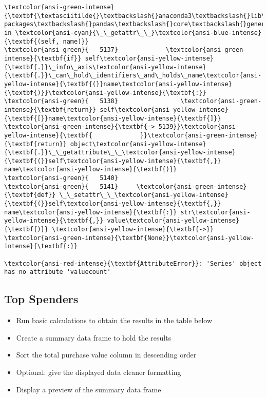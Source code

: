 \documentclass[11pt]{article}
\begin{document}
\begin{Verbatim}[commandchars=\\\{\}, frame=single, framerule=2mm, rulecolor=\color{outerrorbackground}]
\textcolor{ansi-green-intense}{\textbf{\textasciitilde{}\textbackslash{}anaconda3\textbackslash{}lib\textbackslash{}site-packages\textbackslash{}pandas\textbackslash{}core\textbackslash{}generic.py}} in \textcolor{ansi-cyan}{\_\_getattr\_\_}\textcolor{ansi-blue-intense}{\textbf{(self, name)}}
\textcolor{ansi-green}{   5137}             \textcolor{ansi-green-intense}{\textbf{if}} self\textcolor{ansi-yellow-intense}{\textbf{.}}\_info\_axis\textcolor{ansi-yellow-intense}{\textbf{.}}\_can\_hold\_identifiers\_and\_holds\_name\textcolor{ansi-yellow-intense}{\textbf{(}}name\textcolor{ansi-yellow-intense}{\textbf{)}}\textcolor{ansi-yellow-intense}{\textbf{:}}
\textcolor{ansi-green}{   5138}                 \textcolor{ansi-green-intense}{\textbf{return}} self\textcolor{ansi-yellow-intense}{\textbf{[}}name\textcolor{ansi-yellow-intense}{\textbf{]}}
\textcolor{ansi-green-intense}{\textbf{-> 5139}}\textcolor{ansi-yellow-intense}{\textbf{             }}\textcolor{ansi-green-intense}{\textbf{return}} object\textcolor{ansi-yellow-intense}{\textbf{.}}\_\_getattribute\_\_\textcolor{ansi-yellow-intense}{\textbf{(}}self\textcolor{ansi-yellow-intense}{\textbf{,}} name\textcolor{ansi-yellow-intense}{\textbf{)}}
\textcolor{ansi-green}{   5140} 
\textcolor{ansi-green}{   5141}     \textcolor{ansi-green-intense}{\textbf{def}} \_\_setattr\_\_\textcolor{ansi-yellow-intense}{\textbf{(}}self\textcolor{ansi-yellow-intense}{\textbf{,}} name\textcolor{ansi-yellow-intense}{\textbf{:}} str\textcolor{ansi-yellow-intense}{\textbf{,}} value\textcolor{ansi-yellow-intense}{\textbf{)}} \textcolor{ansi-yellow-intense}{\textbf{->}} \textcolor{ansi-green-intense}{\textbf{None}}\textcolor{ansi-yellow-intense}{\textbf{:}}

\textcolor{ansi-red-intense}{\textbf{AttributeError}}: 'Series' object has no attribute 'valuecount'
    \end{Verbatim}

    \hypertarget{top-spenders}{%
\subsection{Top Spenders}\label{top-spenders}}

    \begin{itemize}
\item
  Run basic calculations to obtain the results in the table below
\item
  Create a summary data frame to hold the results
\item
  Sort the total purchase value column in descending order
\item
  Optional: give the displayed data cleaner formatting
\item
  Display a preview of the summary data frame
\end{itemize}
\end{document}
